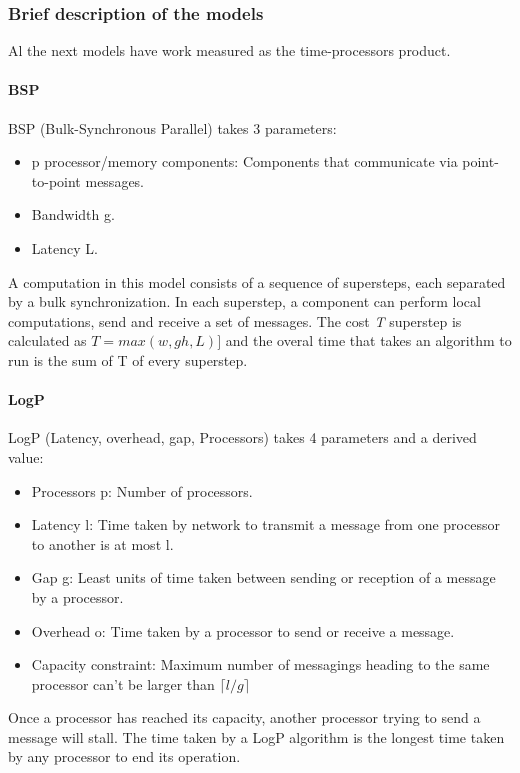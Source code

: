 \documentclass[12pt,a4paper]{article}
\begin{document}
\subsubsection{Brief description of the models}
Al the next models have work measured as the time-processors product.
\paragraph{BSP}
BSP (Bulk-Synchronous Parallel) takes 3 parameters:
\begin{itemize}
	\item p processor/memory components: Components that communicate via point-to-point messages.
	\item Bandwidth g.
	\item Latency L.
\end{itemize}
A computation in this model consists of a sequence of supersteps, each separated by a bulk synchronization. In each superstep, a component can perform local computations, send and receive a set of messages. The cost \textit T superstep is calculated as $T = max(w, gh, L)]$ and the overal time that takes an algorithm to run is the sum of T of every superstep.
\paragraph{LogP}
LogP (Latency, overhead, gap, Processors) takes 4 parameters and a derived value:
\begin{itemize}
	\item Processors p: Number of processors.
	\item Latency l: Time taken by network to transmit a message from one processor to another is at most l.
	\item Gap g: Least units of time taken between sending or reception of a message by a processor.
	\item Overhead o: Time taken by a processor to send or receive a message.
	\item Capacity constraint: Maximum number of messagings heading to the same processor can't be larger than $\lceil l/g \rceil$
\end{itemize}
Once a processor has reached its capacity, another processor trying to send a message will stall. The time taken by a LogP algorithm is the longest time taken by any processor to end its operation.
\end{document}
